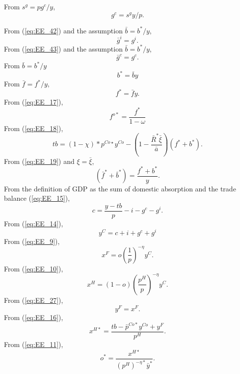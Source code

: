 \documentclass[12pt]{article}
\begin{document}
\noindent From $s^{g}=pg^c/y$,
\begin{equation*}
 g^c=s^{g}y/p.
\end{equation*}%

\noindent From (\ref{eq:EE_42}) and the assumption $\bar{b}=b^*/y$, 
\begin{equation*}
 \bar{g}^i = g^i.   
\end{equation*}
From (\ref{eq:EE_43}) and the assumption $\bar{b}=b^{\ast}/y$,
\begin{equation*}
 \bar{g}^c = g^c.   
\end{equation*}
From $\bar{b} = b^*/y$
\begin{equation*}
b^* = \bar{b}y
\end{equation*}
From $\bar{f} = f^*/y$,
$$f^* = \bar{f}y.$$
From (\ref{eq:EE_17}),
\begin{equation*}
 f^{o*}  = \frac{f^*}{1-\omega}  
\end{equation*}
From (\ref{eq:EE_18}),
\begin{equation*}
tb = (1-\chi)*p^{Co\star}y^{Co} - \left(1-\frac{\bar{R}^*\bar{\xi}}{\bar{a}}\right)(f^*+b^*) .
\end{equation*}
From (\ref{eq:EE_19}) and $\xi = \bar{\xi}$,
\begin{equation*}
(\bar{f}^{\ast}+\bar{b}^{\ast}) = \frac{f^{\ast}+b^{\ast}}{y}.
\end{equation*}
From the definition of GDP as the sum of domestic absorption and the trade balance (\ref{eq:EE_15}),
\begin{equation*}
c=\frac{y-tb}{p}-i-g^c-g^i.
\end{equation*}
From (\ref{eq:EE_14}),
\begin{equation*}
y^C = c + i + g^c + g^i
\end{equation*}%
From (\ref{eq:EE_9}),
\begin{equation*}
x^F = o\left(\frac{1}{p}\right)^{-\eta}y^C.
\end{equation*}%
From (\ref{eq:EE_10}),
\begin{equation*}
x^H = (1-o)\left(\frac{p^H}{p}\right)^{-\eta}y^C.
\end{equation*}%
From (\ref{eq:EE_27}),
\begin{equation*}
y^F=x^F.
\end{equation*}%
From (\ref{eq:EE_16}),
\begin{equation*}
x^{H\ast}= \frac{tb-\bar{p}^{Co\ast }y^{Co}+y^F}{p^H}.
\end{equation*}
From (\ref{eq:EE_11}),
\begin{equation*}
o^{\ast}=\frac{x^{H\ast }}{\left(p^H\right)^{-\eta \ast }\bar{y}^{\ast}}.
\end{equation*}
\end{document}
